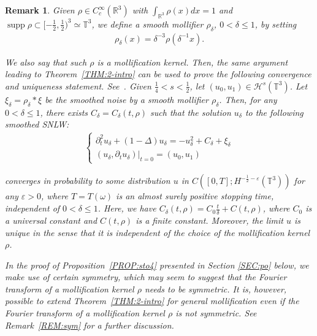 \documentclass[%
11pt,  reqno]{amsart}
\newtheorem{remark}[theorem]{Remark}
\DeclareMathOperator*{\supp}{supp}
\newcommand{\1}{\hspace{0.2mm}\text{I}\hspace{0.2mm}}
\newcommand{\noi}{\noindent}
\newcommand{\Z}{\mathbb{Z}}
\newcommand{\R}{\mathbb{R}}
\newcommand{\T}{\mathbb{T}}
\newcommand{\dl}{\delta}
\newcommand{\Dl}{\Delta}
\newcommand{\eps}{\varepsilon}
\newcommand{\ft}{\widehat}
\newcommand{\dt}{\partial_t}
\renewcommand{\o}{\omega}
\renewcommand{\H}{\mathcal{H}}
\numberwithin{equation}{section}
\numberwithin{theorem}{section}
\begin{document}
\begin{remark} \label{REM:uniq}\rm
Given  $\rho \in C^\infty_c(\R^3)$ 
with   $\int_{\R^3} \rho(x) dx = 1$
and $\supp \rho \subset [-\frac 12, \frac 12)^3\simeq  \T^3$, 
we define a smooth mollifier $\rho_\dl$, $0< \dl \leq 1$, 
by setting
\begin{align}
\rho_\dl(x) = \dl^{-3} \rho(\dl^{-1} x).
\label{molli2}
\end{align}

\noi
We also say that such $\rho$ is a mollification kernel. Then, the same argument leading to Theorem~\ref{THM:2-intro} can be used to prove the following convergence and uniqueness statement.
See~\cite{Hairer, CC}.
Given $\frac 14 < s < \frac 12$, 
let $(u_0, u_1) \in \H^{s}(\T^3)$.
Let $ \xi_\dl =  \rho_\dl * \xi$
be the smoothed noise
by a smooth mollifier $\rho_\dl$.
Then, for any $0< \dl \leq 1$, 
there exists $C_\dl=C_\dl(t, \rho)$
such that 
the solution $u_\dl$ to the following smoothed SNLW:
\begin{align*}
\begin{cases}
\dt^2 u_\dl + (1-  \Dl)  u_\dl  =  - u_\dl^2  + C_\dl+ \xi_\dl\\
(u_\dl, \dt u_\dl)|_{t = 0} = (u_0, u_1)
\end{cases}
\end{align*}

\noi
converges in probability  to some distribution $u$  in $C([0, T]; H^{-\frac 12 -\eps}(\T^3))$
for any $\eps > 0$, 
where $T = T(\o)$ is an almost surely positive stopping time, 
independent of $0< \dl \leq 1$.
Here, we have
$C_\dl(t, \rho) =  C_0 \frac{t}{\dl} + C(t, \rho)$, 
where $C_0$ is a universal constant and $C(t, \rho)$ is a finite constant.
Moreover, the limit $u$ is unique 
in the sense that it is independent
of the choice of the mollification kernel $\rho$.


In the proof of Proposition~\ref{PROP:sto4} presented 
in Section \ref{SEC:po} below, 
we make use of certain symmetry,
which may seem to suggest that 
the Fourier transform of a mollification kernel $\rho$ needs to be symmetric.
It is, however, possible to extend 
Theorem~\ref{THM:2-intro}
for general mollification 
even if the Fourier transform of a mollification kernel $\rho$ is not symmetric.
See Remark~\ref{REM:sym}
for a further discussion.


\end{remark}
\end{document}
